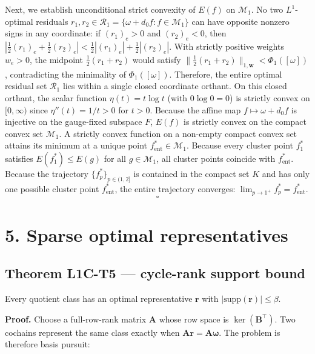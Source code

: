 \documentclass[
]{article}
\begin{document}
Next, we establish unconditional strict convexity of \(E(f)\) on \(\mathcal{M}_1\). No two \(L^1\)-optimal residuals \(r_1, r_2 \in \mathcal{R}_1 = \{\omega + d_0 f : f \in \mathcal{M}_1\}\) can have opposite nonzero signs in any coordinate: if \((r_1)_e > 0\) and \((r_2)_e < 0\), then \(|\frac{1}{2}(r_1)_e + \frac{1}{2}(r_2)_e| < \frac{1}{2}|(r_1)_e| + \frac{1}{2}|(r_2)_e|\). With strictly positive weights \(w_e > 0\), the midpoint \(\frac{1}{2}(r_1 + r_2)\) would satisfy \(\|\frac{1}{2}(r_1 + r_2)\|_{1,\mathbf{w}} < \Phi_1([\omega])\), contradicting the minimality of \(\Phi_1([\omega])\). Therefore, the entire optimal residual set \(\mathcal{R}_1\) lies within a single closed coordinate orthant.
On this closed orthant, the scalar function \(\eta(t) = t \log t\) (with \(0 \log 0 = 0\)) is strictly convex on \([0, \infty)\) since \(\eta''(t) = 1/t > 0\) for \(t > 0\). Because the affine map \(f \mapsto \omega + d_0 f\) is injective on the gauge-fixed subspace \(F\), \(E(f)\) is strictly convex on the compact convex set \(\mathcal{M}_1\). A strictly convex function on a non-empty compact convex set attains its minimum at a unique point \(f_{\text{ent}}^* \in \mathcal{M}_1\).
Because every cluster point \(f_1^*\) satisfies \(E(f_1^*) \le E(g)\) for all \(g \in \mathcal{M}_1\), all cluster points coincide with \(f_{\text{ent}}^*\). Because the trajectory \(\{f_p^*\}_{p \in (1, 2]}\) is contained in the compact set \(K\) and has only one possible cluster point \(f_{\text{ent}}^*\), the entire trajectory converges: \(\lim_{p \to 1^+} f_p^* = f_{\text{ent}}^*\). \[\square\]

\section{5. Sparse optimal representatives}\label{sparse-optimal-representatives}

\subsection{Theorem L1C-T5 --- cycle-rank support bound}\label{theorem-l1c-t5-cycle-rank-support-bound}

Every quotient class has an optimal representative \(\mathbf{r}\) with
\(|\text{supp}(\mathbf{r})| \le \beta\).

\textbf{Proof.} Choose a full-row-rank matrix \(\mathbf{A}\) whose row space is \(\ker(\mathbf{B}^\top)\).
Two cochains represent the same class exactly when \(\mathbf{A}\mathbf{r} = \mathbf{A}\boldsymbol{\omega}\). The problem is
therefore basis pursuit:
\end{document}
